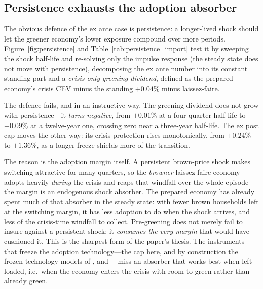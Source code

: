 \documentclass[11pt,a4paper]{article}
\begin{document}
\subsection{Persistence exhausts the adoption absorber}
\label{sec:routeA}

The obvious defence of the ex ante case is persistence: a longer-lived shock
should let the greener economy's lower exposure compound over more periods.
Figure~\ref{fig:persistence} and Table~\ref{tab:persistence_import} test it by
sweeping the shock half-life and re-solving only the impulse response (the steady
state does not move with persistence), decomposing the ex ante number into its
constant standing part and a \emph{crisis-only greening dividend}, defined as the
prepared economy's crisis CEV minus the standing $+0.04\%$ minus laissez-faire.


The defence fails, and in an instructive way. The greening dividend does not grow
with persistence---it \emph{turns negative}, from $+0.01\%$ at a four-quarter
half-life to $-0.09\%$ at a twelve-year one, crossing zero near a three-year
half-life. The ex post cap moves the other way: its crisis protection rises
monotonically, from $+0.24\%$ to $+1.36\%$, as a longer freeze shields more of
the transition.

The reason is the adoption margin itself. A persistent brown-price shock makes
switching attractive for many quarters, so the \emph{browner} laissez-faire
economy adopts heavily \emph{during} the crisis and reaps that windfall over the
whole episode---the margin is an endogenous shock absorber. The prepared economy
has already spent much of that absorber in the steady state: with fewer brown
households left at the switching margin, it has less adoption to do when the shock
arrives, and less of the crisis-time windfall to collect. Pre-greening does not
merely fail to insure against a persistent shock; it \emph{consumes the very
margin} that would have cushioned it. This is the sharpest form of the paper's
thesis. The instruments that freeze the adoption technology---the cap here, and
by construction the frozen-technology models of \citet{Bayer2026},
\citet{Langot2026} and \citet{ARS2024}---miss an absorber that works best when
left loaded, i.e.\ when the economy enters the crisis with room to green rather
than already green.
\end{document}
